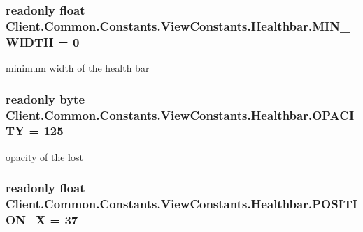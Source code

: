 \subsubsection[{M\+I\+N\+\_\+\+W\+I\+D\+T\+H}]{\setlength{\rightskip}{0pt plus 5cm}readonly float Client.\+Common.\+Constants.\+View\+Constants.\+Healthbar.\+M\+I\+N\+\_\+\+W\+I\+D\+T\+H = 0\hspace{0.3cm}{\ttfamily [static]}}\label{classClient_1_1Common_1_1Constants_1_1ViewConstants_1_1Healthbar_a3178669ef5c1c802c28b99ece9344a9e}


minimum width of the health bar 

\hypertarget{classClient_1_1Common_1_1Constants_1_1ViewConstants_1_1Healthbar_af0cfbb3562957fc39c32055df1f96fa4}{}
\subsubsection[{O\+P\+A\+C\+I\+T\+Y}]{\setlength{\rightskip}{0pt plus 5cm}readonly byte Client.\+Common.\+Constants.\+View\+Constants.\+Healthbar.\+O\+P\+A\+C\+I\+T\+Y = 125\hspace{0.3cm}{\ttfamily [static]}}\label{classClient_1_1Common_1_1Constants_1_1ViewConstants_1_1Healthbar_af0cfbb3562957fc39c32055df1f96fa4}


opacity of the lost 

\hypertarget{classClient_1_1Common_1_1Constants_1_1ViewConstants_1_1Healthbar_ade754baed84f2531b270446a68e1d2ef}{}
\subsubsection[{P\+O\+S\+I\+T\+I\+O\+N\+\_\+\+X}]{\setlength{\rightskip}{0pt plus 5cm}readonly float Client.\+Common.\+Constants.\+View\+Constants.\+Healthbar.\+P\+O\+S\+I\+T\+I\+O\+N\+\_\+\+X = 37\hspace{0.3cm}{\ttfamily [static]}}\label{classClient_1_1Common_1_1Constants_1_1ViewConstants_1_1Healthbar_ade754baed84f2531b270446a68e1d2ef}


